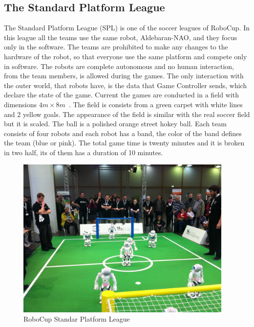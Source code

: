 \subsection{The Standard Platform League}
The Standard Platform League (SPL) is one of the soccer leagues of RoboCup. In this league all the teams use the same robot, Aldebaran-NAO, and they focus only in the software. The teams are prohibited to make any changes to the hardware of the robot, so that everyone use the same platform and compete only in software. The robots are complete autonomous and no human interaction, from the team members, is allowed during the games. The only interaction with the outer world, that robots have, is the data that Game Controller sends, which declare the state of the game.
Current the games are conducted in a field with dimensions \(4m \times 8m\)~\cite{SPLrules2012}. The field is consists from a green carpet with white lines and 2 yellow goals. The appearance of the field is similar with the real soccer field but it is scaled. The ball is a polished orange street hokey ball. Each team consists of four robots and each robot has a band, the color of the band defines the team (blue or pink). The total game time is twenty minutes and it is broken in two half, its of them has a duration of 10 minutes.
\begin{figure}[h]
	\begin{center}
		\includegraphics[height = 8cm]{Figures/RoboCupSpl.jpg}
 		\caption{RoboCup Standar Platform League}
 		\label{fig:RoboCup SPL}
	\end{center}
\end{figure}
